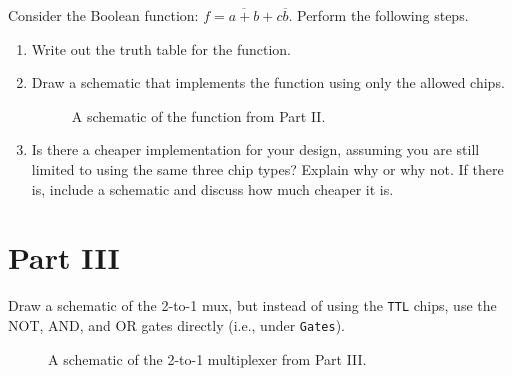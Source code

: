 \documentclass{article}
\begin{document}
Consider the Boolean function: $f = \overline{a + b} + c\overline{b}$.
Perform the following steps.

\begin{enumerate}

\item Write out the truth table for the function.

\item Draw a schematic that implements the function using only the allowed chips.

\begin{figure}[!ht]
    \centering
    \caption{A schematic of the function from Part II.}
    \label{f:part2}
\end{figure}

\item Is there a cheaper implementation for your design, assuming you are still limited to using the same three chip types?
    Explain why or why not.
    If there is, include a schematic and discuss how much cheaper it is.

\end{enumerate}

\newpage
\section*{Part III}

Draw a schematic of the 2-to-1 mux, but instead of using the \verb|TTL| chips, use the NOT, AND, and OR gates directly (i.e., under \verb|Gates|).

\begin{figure}[!ht]
    \centering
    \caption{A schematic of the 2-to-1 multiplexer from Part III.}
    \label{f:part3}
\end{figure}
\end{document}
